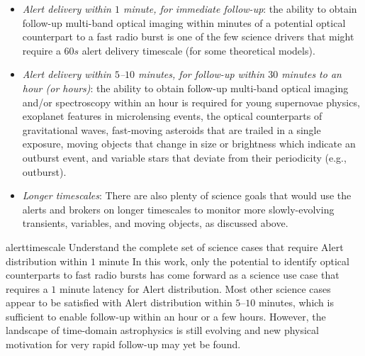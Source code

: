 \medskip
{}
\begin{itemize}
\item {\it  {Alert} delivery within $1$ minute, for immediate follow-up}: the ability to obtain follow-up multi-band optical imaging within minutes of a potential optical counterpart to a fast radio burst is one of the few science drivers that might require a $60s$ alert delivery timescale (for some theoretical models).
\item {\it  {Alert} delivery within $5$--$10$ minutes, for follow-up within $30$ minutes to an hour (or hours)}: the ability to obtain follow-up multi-band optical imaging and/or spectroscopy within an hour is required for young supernovae physics, exoplanet features in microlensing events, the optical counterparts of gravitational waves, fast-moving asteroids that are trailed in a single exposure, moving objects that change in size or brightness which indicate an outburst event, and variable stars that deviate from their periodicity (e.g., outburst).
\item {\it Longer timescales}: There are also plenty of science goals that would use the alerts and brokers on longer timescales to monitor more slowly-evolving transients, variables, and moving objects, as discussed above.
\end{itemize}

\nrec
{alerttimescale}
{Understand the complete set of science cases that require  {Alert} distribution within $1$ minute}
{In this work, only the potential to identify optical counterparts to fast radio bursts has come forward as a science use case that requires a $1$ minute latency for  {Alert} distribution. Most other science cases appear to be satisfied with  {Alert} distribution within $5$--$10$ minutes, which is sufficient to enable follow-up within an hour or a few hours. However, the landscape of time-domain astrophysics is still evolving and new physical motivation for very rapid follow-up may yet be found.}


